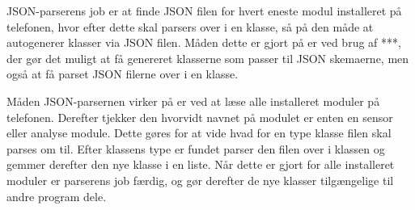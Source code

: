 JSON-parserens job er at finde JSON filen for hvert eneste modul installeret på telefonen, hvor efter dette skal parsers over i en klasse, så på den måde at autogenerer klasser via JSON filen.
Måden dette er gjort på er ved brug af ***, der gør det muligt at få genereret klasserne som passer til JSON skemaerne, men også at få parset JSON filerne over i en klasse. 

Måden JSON-parsernen virker på er ved at læse alle installeret moduler på telefonen.
Derefter tjekker den hvorvidt navnet på modulet er enten en sensor eller analyse module.
Dette gøres for at vide hvad for en type klasse filen skal parses om til.
Efter klassens type er fundet parser den filen over i klassen og gemmer derefter den nye klasse i en liste.
Når dette er gjort for alle installeret moduler er parserens job færdig, og gør derefter de nye klasser tilgængelige til andre program dele.